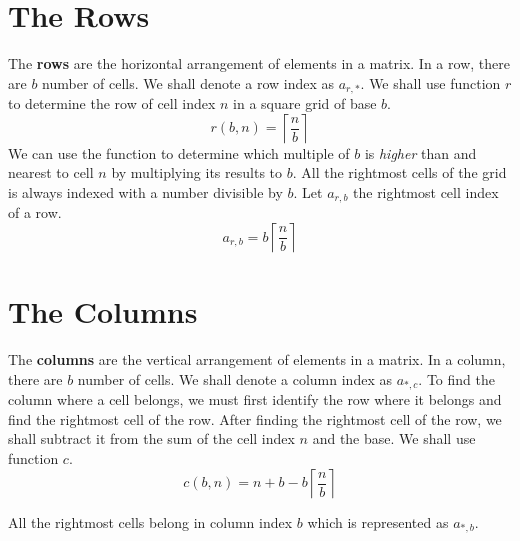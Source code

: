 \documentclass[letterpaper, twoside,12pt]{book}
\begin{document}
    \section{The Rows} \label{rows}
    The \textbf{rows} are the horizontal arrangement of elements in a matrix. In a row, there are $b$ number of cells. We shall denote a row index as $a_{r,*}$. We shall use function $r$ to determine the row of cell index $n$ in a square grid of base $b$.
    \begin{equation}
        r(b,n) = \left\lceil \frac{n}{b} \right\rceil
    \end{equation}
    We can use the function to determine which multiple of $b$ is \emph{higher} than and nearest to cell $n$ by multiplying its results to $b$. All the rightmost cells of the grid is always indexed with a number divisible by $b$. Let $a_{r,b}$ the rightmost cell index of a row.
    \begin{equation}
        a_{r,b} = b\left\lceil \frac{n}{b} \right\rceil
    \end{equation}

    \section{The Columns} \label{columns}
    The \textbf{columns} are the vertical arrangement of elements in a matrix. In a column, there are $b$ number of cells. We shall denote a column index as $a_{*,c}$. To find the column where a cell belongs, we must first identify the row where it belongs and find the rightmost cell of the row. After finding the rightmost cell of the row, we shall subtract it from the sum of the cell index $n$ and the base. We shall use function $c$.
    \begin{equation}
        c(b,n) = n + b - b\left\lceil \frac{n}{b} \right\rceil
    \end{equation}

    All the rightmost cells belong in column index $b$ which is represented as $a_{*,b}$.

    \newpage
\end{document}
